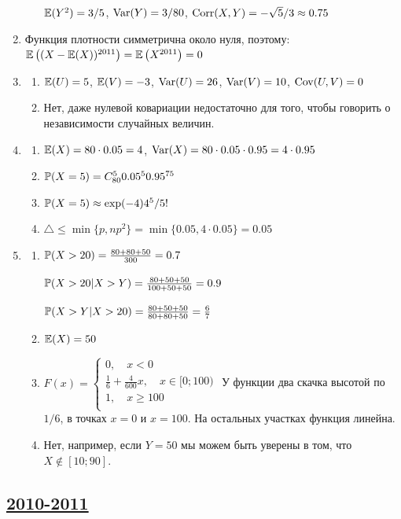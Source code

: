 \begin{enumerate}
\begin{enumerate}
$\E(Y^2) = 3/5$, $\Var(Y) = 3/80$, $\Corr(X,Y) = -\sqrt{5}/3 \approx 0.75$
\end{enumerate}
\item Функция плотности симметрична около нуля, поэтому: $\E\left((X - \E(X))^{2011}\right) =
\E\left(X^{2011}\right) = 0$
\item
\begin{enumerate}
\item $\E(U) = 5$, $\E(V) = -3$, $\Var(U) = 26$, $\Var(V) = 10$, $\Cov(U,V) = 0$
\item Нет, даже нулевой ковариации недостаточно для того, чтобы говорить о
независимости случайных величин.
\end{enumerate}
\item
\begin{enumerate}
\item $ \E(X) = 80\cdot 0.05 = 4$, $\Var(X) = 80 \cdot 0.05 \cdot 0.95 = 4 \cdot 0.95$
\item $ \P(X = 5) = C_{80}^{5}0.05^{5}0.95^{75}$
\item $ \P(X = 5) \approx \exp(-4)4^5/5!$
\item $ \triangle\leq \min\{p,np^2\} = \min\{0.05,4\cdot 0.05\} = 0.05$
\end{enumerate}
\item
\begin{enumerate}
\item $\P(X > 20) = \frac{80 + 80 + 50}{300} = 0.7$

$\P(X > 20|X > Y) = \frac{80 + 50 + 50}{100 + 50 + 50} = 0.9$

$\P(X > Y|X > 20) = \frac{80 + 50 + 50}{80 + 80 + 50} = \frac{6}{7}$
\item $\E(X) = 50$
\item $
F(x) =
\begin{cases}
    0, \quad x<0 \\
    \frac{1}{6}+\frac{4}{600}x, \quad x\in [0;100) \\
    1, \quad x\geq 100 \\
\end{cases}$
У функции два скачка высотой по $1/6$, в точках $x = 0$ и $x = 100$. На остальных
участках функция линейна.
\item Нет, например, если $Y=50$ мы можем быть уверены в том, что $X\notin [10;90]$.
\end{enumerate}
\end{enumerate}


\subsection[2010-2011]{\hyperref[sec:kr_01_2010_2011]{2010-2011}}
\label{sec:sol_kr_01_2010_2011}

